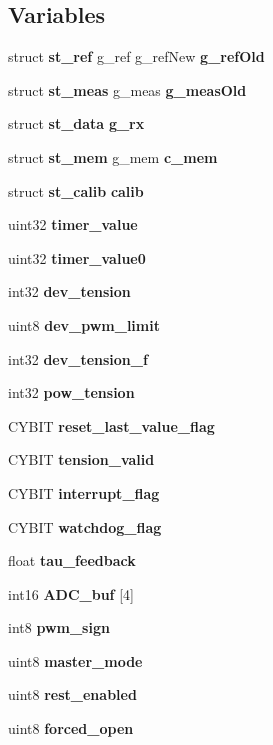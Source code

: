 \subsection*{Variables}
\begin{DoxyCompactItemize}
\item 
struct \textbf{ st\+\_\+ref} g\+\_\+ref g\+\_\+ref\+New \textbf{ g\+\_\+ref\+Old}
\item 
struct \textbf{ st\+\_\+meas} g\+\_\+meas \textbf{ g\+\_\+meas\+Old}
\item 
struct \textbf{ st\+\_\+data} \textbf{ g\+\_\+rx}
\item 
struct \textbf{ st\+\_\+mem} g\+\_\+mem \textbf{ c\+\_\+mem}
\item 
\mbox{\label{globals_8h_aed96fdd8308fe2c4fc07c3b5db1c7bbb}} 
struct \textbf{ st\+\_\+calib} {\bfseries calib}
\item 
uint32 \textbf{ timer\+\_\+value}
\item 
uint32 \textbf{ timer\+\_\+value0}
\item 
int32 \textbf{ dev\+\_\+tension}
\item 
uint8 \textbf{ dev\+\_\+pwm\+\_\+limit}
\item 
int32 \textbf{ dev\+\_\+tension\+\_\+f}
\item 
\mbox{\label{globals_8h_a63d713ff9ac5ba0651f6af9115a32e4d}} 
int32 {\bfseries pow\+\_\+tension}
\item 
C\+Y\+B\+IT \textbf{ reset\+\_\+last\+\_\+value\+\_\+flag}
\item 
C\+Y\+B\+IT \textbf{ tension\+\_\+valid}
\item 
C\+Y\+B\+IT \textbf{ interrupt\+\_\+flag}
\item 
C\+Y\+B\+IT \textbf{ watchdog\+\_\+flag}
\item 
float \textbf{ tau\+\_\+feedback}
\item 
\mbox{\label{globals_8h_abb22f0a4462a0b4db27496654f2175a0}} 
int16 {\bfseries A\+D\+C\+\_\+buf} [4]
\item 
int8 \textbf{ pwm\+\_\+sign}
\item 
\mbox{\label{globals_8h_acf0e2a5d5954714103e295ac35513215}} 
uint8 {\bfseries master\+\_\+mode}
\item 
\mbox{\label{globals_8h_a1f8839fadee52a47a0042eaa695c3f3a}} 
uint8 {\bfseries rest\+\_\+enabled}
\item 
\mbox{\label{globals_8h_a0f13b80a0c329fa3176eb1e72ef36fb8}} 
uint8 {\bfseries forced\+\_\+open}
\item 
\mbox{\label{globals_8h_a485e5b90bbfb79aa97f874873cd6c93a}} 

\end{DoxyCompactItemize}
